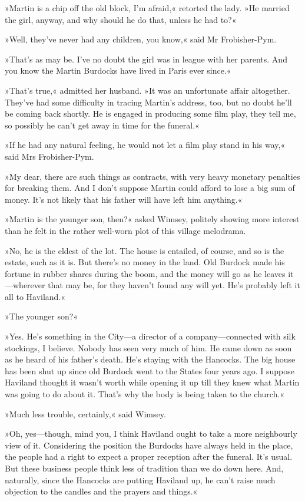 »Martin is a chip off the old block, I'm afraid,« retorted the lady. »He married the girl, anyway, and why should he do that, unless he had to?«

»Well, they've never had any children, you know,« said Mr Frobisher-Pym.

»That's as may be. I've no doubt the girl was in league with her parents. And you know the Martin Burdocks have lived in Paris ever since.«

»That's true,« admitted her husband. »It was an unfortunate affair altogether. They've had some difficulty in tracing Martin's address, too, but no doubt he'll be coming back shortly. He is engaged in producing some film play, they tell me, so possibly he can't get away in time for the funeral.«

»If he had any natural feeling, he would not let a film play stand in his way,« said Mrs Frobisher-Pym.

»My dear, there are such things as contracts, with very heavy monetary penalties for breaking them. And I don't suppose Martin could afford to lose a big sum of money. It's not likely that his father will have left him anything.«

»Martin is the younger son, then?« asked Wimsey, politely showing more interest than he felt in the rather well-worn plot of this village melodrama.

»No, he is the eldest of the lot. The house is entailed, of course, and so is the estate, such as it is. But there's no money in the land. Old Burdock made his fortune in rubber shares during the boom, and the money will go as he leaves it—wherever that may be, for they haven't found any will yet. He's probably left it all to Haviland.«

»The younger son?«

»Yes. He's something in the City—a director of a company—connected with silk stockings, I believe. Nobody has seen very much of him. He came down as soon as he heard of his father's death. He's staying with the Hancocks. The big house has been shut up since old Burdock went to the States four years ago. I suppose Haviland thought it wasn't worth while opening it up till they knew what Martin was going to do about it. That's why the body is being taken to the church.«

»Much less trouble, certainly,« said Wimsey.

»Oh, yes—though, mind you, I think Haviland ought to take a more neighbourly view of it. Considering the position the Burdocks have always held in the place, the people had a right to expect a proper reception after the funeral. It's usual. But these business people think less of tradition than we do down here. And, naturally, since the Hancocks are putting Haviland up, he can't raise much objection to the candles and the prayers and things.«

